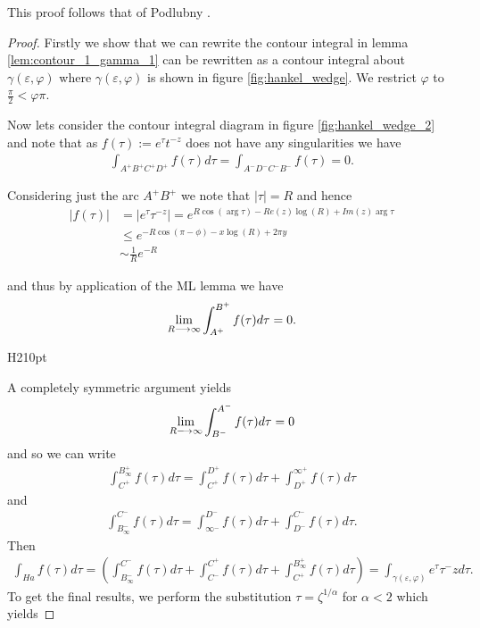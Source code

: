 This proof follows that of Podlubny \cite{Podlubny1999}.
\begin{proof}

Firstly we show that we can rewrite the contour integral in lemma \ref{lem:contour_1_gamma_1} can be rewritten as a contour
integral about $ \gamma(\varepsilon, \varphi) $ where $ \gamma(\varepsilon, \varphi) $ is shown in figure \ref{fig:hankel_wedge}. We restrict $ \varphi $ to $ \frac{\pi}{2} < \varphi \pi $. 

Now lets consider the contour integral diagram in figure \ref{fig:hankel_wedge_2} and note that as $ f(\tau) := e^\tau t^{-z} $ does not have any singularities we have
\begin{align}
    \int_{A^+ B^+ C^+ D^+} f(\tau) d\tau = \int_{A^-D^-C^-B^-} f(\tau) = 0.
\end{align}

Considering just the arc $ A^+B^+ $ we note that $ |\tau| = R $ and hence
\begin{align*}
    |f(\tau)| &= |e^\tau \tau^{-z}| = e^{R\cos(\arg \tau) - Re(z) \log(R) + Im(z) \arg \tau} \\
      &\leq e^{-R\cos(\pi - \phi) - x \log(R) + 2 \pi y} \\
      &\sim \frac{1}{R}e^{-R}
\end{align*}

and thus by application of the ML lemma we have
\begin{align*}
    \lim_{R \longrightarrow \infty} \int_{A^+}^{B^+} f(\tau) d\tau = 0.
\end{align*}

 \begin{wrapfigure}{H}{210pt}

\caption{The Hankel countour $ \gamma(\varepsilon, \varphi) $}
\label{fig:hankel_wedge}
\end{wrapfigure}

A completely symmetric argument yields
\begin{align*}
    \lim_{R \longrightarrow \infty} \int_{B^-}^{A^-} f(\tau) d\tau = 0
\end{align*}
and so we can write
\begin{align*}
    \int_{C^+}^{B_\infty^+} f(\tau)d\tau = \int_{C^+}^{D^+} f(\tau)d\tau + \int_{D^+}^{\infty^+} f(\tau)d\tau
\end{align*}
and
\begin{align*}
    \int_{B_\infty^-}^{C^-} f(\tau)d\tau = \int_{\infty^-}^{D^-} f(\tau)d\tau + \int_{D^-}^{C^-} f(\tau)d\tau.
\end{align*}
Then
\begin{align*}
    \int_{Ha} f(\tau) d\tau = \left( \int_{B_\infty^-}^{C^-} f(\tau)d\tau + \int_{C^-}^{C^+} f(\tau)d\tau +  \int_{C^+}^{B_\infty^+} f(\tau)d\tau \right) = \int_{\gamma(\varepsilon, \varphi)}e^\tau \tau^-z d\tau.
\end{align*}
To get the final results, we perform the substitution $ \tau = \zeta^{1/\alpha} $ for $ \alpha < 2 $
which yields


\end{proof}
